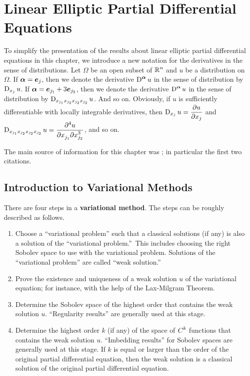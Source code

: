 \chapter{Linear Elliptic Partial Differential Equations}
\label{elliptic_PDEs}

To simplify the presentation of the results about linear elliptic partial
differential equations in this chapter, we introduce a new notation
for the derivatives in the sense of distributions. Let $\Omega$ be an
open subset of $\DS \RR^n$ and $u$ be a distribution on $\Omega$.  If
$\VEC{\alpha} = \VEC{e}_j$, then we denote the derivative
$\DS \diff^{\VEC{\alpha}} u$ in the sense of distribution by
$\diff_{x_j} u$.  If $\VEC{\alpha} = \VEC{e}_{j_1} + 3 \VEC{e}_{j_2}$,
then we denote the derivative $\DS \diff^{\VEC{\alpha}} u$ in the
sense of distribution by $\diff_{x_{j_1}x_{j_2}x_{j_2}x_{j_2}} u$.  And so on.
Obviously, if $u$ is sufficiently differentiable with locally
integrable derivatives, then $\DS \diff_{x_j} u = \pdydx{u}{x_j}$
and $\DS \diff_{x_{j_1}x_{j_2}x_{j_2}x_{j_2}} u
= \pdydxnm{u}{x_{j_1}}{x_{j_2}}{4}{}{3}$, and so on.

The main source of information for this chapter was
\cite{Br,FoPDE,RenRog,Tr}; in particular the first two
citations.

\section{Introduction to Variational Methods}

There are four steps in a {\bfseries variational method}.  The steps
can be roughly described as follows.
\begin{enumerate}
\item Choose a ``variational problem'' such that a
classical solutions (if any) is also a solution of the
``variational problem.''\  This includes choosing the right Sobolev
space to use with the variational problem.  Solutions of the
``variational problem'' are called ``weak solution.''
\item Prove the existence and uniqueness of a weak solution $u$ of the
variational equation; for instance, with the help of the Lax-Milgram Theorem.
\item \label{ell_wsd1} Determine the Sobolev space of the highest
order that contains the weak solution $u$.  ``Regularity results''
are generally used at this stage.
\item Determine the highest order $k$ (if any) of the space of
$\DS C^k$ functions that contains the weak solution $u$.
``Imbedding results'' for Sobolev spaces are generally used at this stage.
If $k$ is equal or larger than the order of the original partial
differential equation, then the weak solution is a classical solution
of the original partial differential equation.
\end{enumerate}

